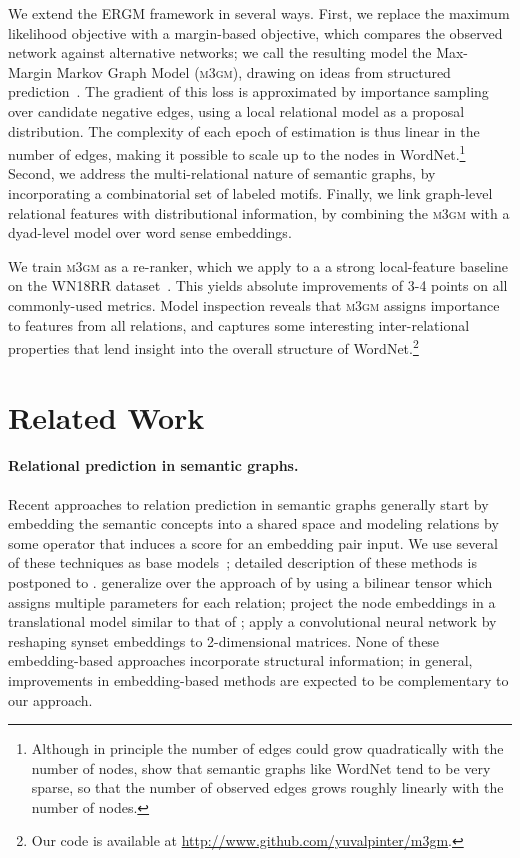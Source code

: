 \documentclass[11pt,twocolumn]{article}
\newcommand{\WN}[0]{WordNet}
\newcommand{\ergm}[0]{ERGM}
\newcommand{\sysname}[0]{\textsc{m3gm}}
\begin{document}
We extend the \ergm{} framework in several ways.
First, we replace the maximum likelihood objective with a margin-based objective, which compares the observed network against alternative networks;
we call the resulting model the Max-Margin Markov Graph Model (\sysname{}), drawing on ideas from structured prediction~\citep{MMMN}.
The gradient of this loss is approximated by importance sampling over candidate negative edges, using a local relational model as a proposal distribution.
The complexity of each epoch of estimation is thus linear in the number of edges, making it possible to scale up to  the  nodes in \WN{}.\footnote{Although in principle the number of edges could grow quadratically with the number of nodes,  show that semantic graphs like WordNet tend to be very sparse, so that the number of observed edges grows roughly linearly with the number of nodes.}
Second, we address the multi-relational nature of semantic graphs, by incorporating a combinatorial set of labeled motifs.
Finally, we link graph-level relational features with distributional information, by combining the \sysname{} with a dyad-level model over word sense embeddings.

We train \sysname{} as a re-ranker, which we apply to a a strong local-feature baseline on the WN18RR dataset~\cite{dettmers2018conve}. This yields absolute improvements of 3-4 points on all commonly-used metrics. 
Model inspection reveals that \sysname{} assigns importance to features from all relations, and captures some interesting inter-relational properties that lend insight into the overall structure of \WN{}.\footnote{Our code is available at \url{http://www.github.com/yuvalpinter/m3gm}.}
 
\section{Related Work}

\paragraph{Relational prediction in semantic graphs.} Recent approaches to relation prediction in semantic graphs generally start by embedding the semantic concepts into a shared space and modeling relations by some operator that induces a score for an embedding pair input.
We use several of these techniques as base models~\cite{nickel2011three,bordes2013translating,yang2014embedding}; detailed description of these methods is postponed to .
 generalize over the approach of 
by using a bilinear tensor which assigns multiple parameters for each relation;  project the node embeddings in a translational model similar to that of ;  apply a convolutional neural network by reshaping synset embeddings to 2-dimensional matrices. None of these embedding-based approaches incorporate structural information; in general, improvements in embedding-based methods are expected to be complementary to our approach.
\end{document}
